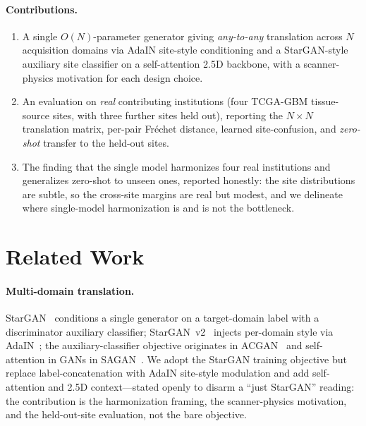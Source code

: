 \documentclass[runningheads]{llncs}
\begin{document}
\paragraph{Contributions.}
\begin{enumerate}
  \item A single $O(N)$-parameter generator giving \emph{any-to-any} translation
        across $N$ acquisition domains via AdaIN site-style conditioning and a
        StarGAN-style auxiliary site classifier on a self-attention 2.5D backbone,
        with a scanner-physics motivation for each design choice.
  \item An evaluation on \emph{real} contributing institutions (four TCGA-GBM
        tissue-source sites, with three further sites held out), reporting the
        $N{\times}N$ translation matrix, per-pair Fr\'echet distance, learned
        site-confusion, and \emph{zero-shot} transfer to the held-out sites.
  \item The finding that the single model harmonizes four real institutions and
        generalizes zero-shot to unseen ones, reported honestly: the site
        distributions are subtle, so the cross-site margins are real but modest,
        and we delineate where single-model harmonization is and is not the
        bottleneck.
\end{enumerate}

\section{Related Work}
\label{sec:related}
\paragraph{Multi-domain translation.}
StarGAN~\cite{choi2018stargan} conditions a single generator on a target-domain
label with a discriminator auxiliary classifier; StarGAN~v2~\cite{choi2020starganv2}
injects per-domain style via AdaIN~\cite{huang2017adain}; the auxiliary-classifier
objective originates in ACGAN~\cite{odena2017acgan} and self-attention in GANs in
SAGAN~\cite{zhang2019sagan}. We adopt the StarGAN training objective but replace
label-concatenation with AdaIN site-style modulation and add self-attention and
2.5D context---stated openly to disarm a ``just StarGAN'' reading: the
contribution is the harmonization framing, the scanner-physics motivation, and the
held-out-site evaluation, not the bare objective.
\end{document}
